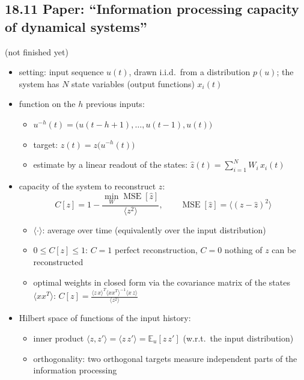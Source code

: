 \subsection*{18.11 \quad Paper: ``Information processing capacity of dynamical systems''}
\label{sec:ipc-paper}
(not finished yet)
\begin{itemize}
    \item setting: input sequence $u(t)$, drawn i.i.d.\ from a distribution $p(u)$; the system has $N$ state
    variables (output functions) $x_i(t)$
    \item function on the $h$ previous inputs:
    \begin{itemize}
        \item $u^{-h}(t) = \big(u(t-h+1), \ldots, u(t-1), u(t)\big)$
        \item target: $z(t) = z\big(u^{-h}(t)\big)$
        \item estimate by a linear readout of the states: $\hat{z}(t) = \sum_{i=1}^{N} W_i\, x_i(t)$
    \end{itemize}
    \item capacity of the system to reconstruct $z$:
    \begin{equation*}
        C[z] = 1 - \frac{\min_W \operatorname{MSE}[\hat{z}]}{\langle z^2 \rangle},
        \qquad \operatorname{MSE}[\hat{z}] = \big\langle (z - \hat{z})^2 \big\rangle
    \end{equation*}
    \begin{itemize}
        \item $\langle \cdot \rangle$: average over time (equivalently over the input distribution)
        \item $0 \le C[z] \le 1$: $C = 1$ perfect reconstruction, $C = 0$ nothing of $z$ can be reconstructed
        \item optimal weights in closed form via the covariance matrix of the states
        $\langle x x^T \rangle$:
        $C[z] = \frac{\langle z\, x \rangle^T \langle x x^T \rangle^{-1} \langle x\, z \rangle}{\langle z^2 \rangle}$
    \end{itemize}
    \item Hilbert space of functions of the input history:
    \begin{itemize}
        \item inner product $\langle z, z' \rangle = \langle z\, z' \rangle = \mathbb{E}_u[z\, z']$
        (w.r.t.\ the input distribution)
        \item orthogonality: two orthogonal targets measure independent parts of the information processing

\end{itemize}
\end{itemize}
